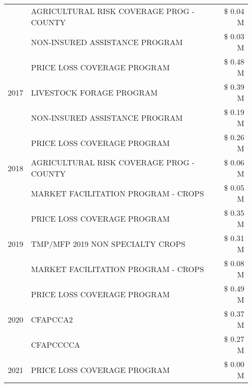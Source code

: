 \begin{tabular}{llr}
 & AGRICULTURAL RISK COVERAGE PROG - COUNTY      & \$ 0.04 M \\
 & NON-INSURED ASSISTANCE PROGRAM                & \$ 0.03 M \\
\cline{1-3}
\multirow[t]{3}{*}{2017} & PRICE LOSS COVERAGE PROGRAM & \$ 0.48 M \\
 & LIVESTOCK FORAGE PROGRAM & \$ 0.39 M \\
 & NON-INSURED ASSISTANCE PROGRAM & \$ 0.19 M \\
\cline{1-3}
\multirow[t]{3}{*}{2018} & PRICE LOSS COVERAGE PROGRAM & \$ 0.26 M \\
 & AGRICULTURAL RISK COVERAGE PROG - COUNTY & \$ 0.06 M \\
 & MARKET FACILITATION PROGRAM - CROPS & \$ 0.05 M \\
\cline{1-3}
\multirow[t]{3}{*}{2019} & PRICE LOSS COVERAGE PROGRAM & \$ 0.35 M \\
 & TMP/MFP 2019 NON SPECIALTY CROPS & \$ 0.31 M \\
 & MARKET FACILITATION PROGRAM - CROPS & \$ 0.08 M \\
\cline{1-3}
\multirow[t]{3}{*}{2020} & PRICE LOSS COVERAGE PROGRAM & \$ 0.49 M \\
 & CFAPCCA2 & \$ 0.37 M \\
 & CFAPCCCCA & \$ 0.27 M \\
\cline{1-3}
2021 & PRICE LOSS COVERAGE PROGRAM & \$ 0.00 M \\
\cline{1-3}
\bottomrule
\end{tabular}
